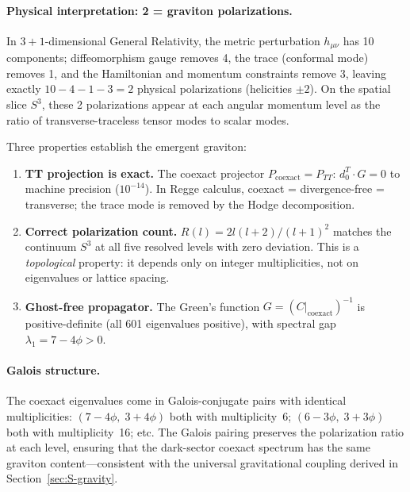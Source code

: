 \documentclass[12pt,a4paper]{article}
\theoremstyle{definition}
\begin{document}
\paragraph{Physical interpretation: 2 = graviton polarizations.}
In $3\!+\!1$-dimensional General Relativity, the metric perturbation $h_{\mu\nu}$ has 10 components; diffeomorphism gauge removes 4, the trace (conformal mode) removes 1, and the Hamiltonian and momentum constraints remove 3, leaving exactly $10 - 4 - 1 - 3 = 2$ physical polarizations (helicities $\pm 2$).  On the spatial slice $S^3$, these 2 polarizations appear at each angular momentum level as the ratio of transverse-traceless tensor modes to scalar modes.

Three properties establish the emergent graviton:
\begin{enumerate}
\item \textbf{TT projection is exact.}  The coexact projector $P_{\mathrm{coexact}} = P_{TT}$: $d_0^T \cdot G = 0$ to machine precision ($10^{-14}$).  In Regge calculus, coexact = divergence-free = transverse; the trace mode is removed by the Hodge decomposition.

\item \textbf{Correct polarization count.}  $R(l) = 2l(l+2)/(l+1)^2$ matches the continuum $S^3$ at all five resolved levels with zero deviation.  This is a \emph{topological} property: it depends only on integer multiplicities, not on eigenvalues or lattice spacing.

\item \textbf{Ghost-free propagator.}  The Green's function $G = (C|_{\mathrm{coexact}})^{-1}$ is positive-definite (all 601 eigenvalues positive), with spectral gap $\lambda_1 = 7 - 4\phi > 0$.
\end{enumerate}

\paragraph{Galois structure.}
The coexact eigenvalues come in Galois-conjugate pairs with identical multiplicities: $(7-4\phi,\; 3+4\phi)$ both with multiplicity~6; $(6-3\phi,\; 3+3\phi)$ both with multiplicity~16; etc.  The Galois pairing preserves the polarization ratio at each level, ensuring that the dark-sector coexact spectrum has the same graviton content---consistent with the universal gravitational coupling derived in Section~\ref{sec:S-gravity}.
\end{document}
